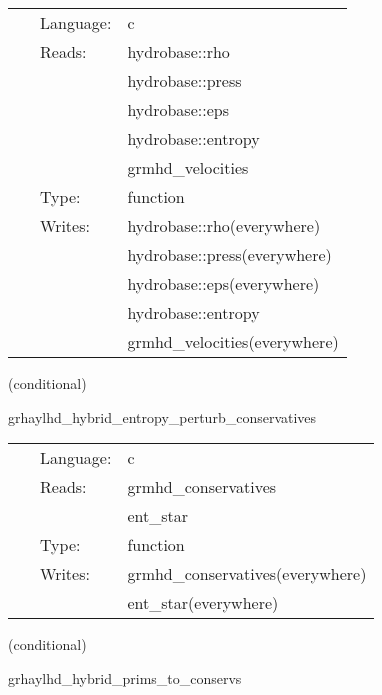 \documentclass{article}
\begin{document}
 \begin{tabular*}{160mm}{cll} 
~ & Language:  & c \\ 
~ & Reads:  & hydrobase::rho \\ 
~& ~ &hydrobase::press\\ 
~& ~ &hydrobase::eps\\ 
~& ~ &hydrobase::entropy\\ 
~& ~ &grmhd\_velocities\\ 
~ & Type:  & function \\ 
~ & Writes:  & hydrobase::rho(everywhere) \\ 
~& ~ &hydrobase::press(everywhere)\\ 
~& ~ &hydrobase::eps(everywhere)\\ 
~& ~ &hydrobase::entropy\\ 
~& ~ &grmhd\_velocities(everywhere)\\ 
\end{tabular*} 


\vspace{5mm}

   (conditional) 

\hspace{5mm} grhaylhd\_hybrid\_entropy\_perturb\_conservatives 

\hspace{5mm}{\it entropy+hybrid version of grhaylhd\_perturb\_conservatives } 


\hspace{5mm}

 \begin{tabular*}{160mm}{cll} 
~ & Language:  & c \\ 
~ & Reads:  & grmhd\_conservatives \\ 
~& ~ &ent\_star\\ 
~ & Type:  & function \\ 
~ & Writes:  & grmhd\_conservatives(everywhere) \\ 
~& ~ &ent\_star(everywhere)\\ 
\end{tabular*} 


\vspace{5mm}

   (conditional) 

\hspace{5mm} grhaylhd\_hybrid\_prims\_to\_conservs 

\hspace{5mm}{\it hybrid version of grhaylhd\_prims\_to\_conservs } 
\end{document}
